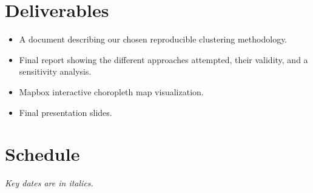 \documentclass[11pt, a4paper]{article}
\begin{document}
\section*{Deliverables}

\begin{itemize}
\item A document describing our chosen reproducible clustering methodology.
\item Final report showing the different approaches attempted, their validity, and a sensitivity analysis.
\item Mapbox interactive choropleth map visualization.
\item Final presentation slides.
\end{itemize}




\pagebreak
\section*{Schedule}

\textit{Key dates are in italics.}
\end{document}
